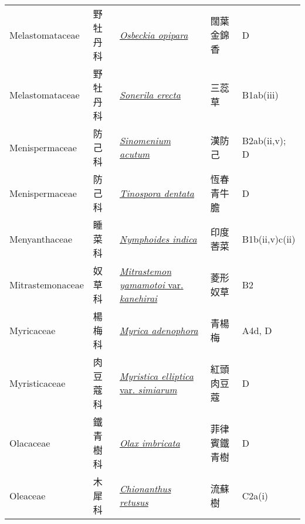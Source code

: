 {\begin{longtable}{p{2.5cm}p{2.5cm}p{4.5cm}p{2.5cm}p{3cm}}
    Melastomataceae & 野牡丹科 & \href{http://www.theplantlist.org/tpl1.1/search?q=Osbeckia+opipara}{\textit{Osbeckia opipara} } & 闊葉金錦香 & D \index{Osbeckia@\textit{Osbeckia}!opipara@\textit{opipara}}  \index{闊葉金錦香} \\
    Melastomataceae & 野牡丹科 & \href{http://www.theplantlist.org/tpl1.1/search?q=Sonerila+erecta}{\textit{Sonerila erecta} } & 三蕊草 & B1ab(iii) \index{Sonerila@\textit{Sonerila}!erecta@\textit{erecta}}  \index{三蕊草} \\
    Menispermaceae & 防己科 & \href{http://www.theplantlist.org/tpl1.1/search?q=Sinomenium+acutum}{\textit{Sinomenium acutum} } & 漢防己 & B2ab(ii,v); D \index{Sinomenium@\textit{Sinomenium}!acutum@\textit{acutum}}  \index{漢防己} \\
    Menispermaceae & 防己科 & \href{http://www.theplantlist.org/tpl1.1/search?q=Tinospora+dentata}{\textit{Tinospora dentata} } & 恆春青牛膽 & D \index{Tinospora@\textit{Tinospora}!dentata@\textit{dentata}}  \index{恆春青牛膽} \\
    Menyanthaceae & 睡菜科 & \href{http://www.theplantlist.org/tpl1.1/search?q=Nymphoides+indica}{\textit{Nymphoides indica} } & 印度莕菜 & B1b(ii,v)c(ii) \index{Nymphoides@\textit{Nymphoides}!indica@\textit{indica}}  \index{印度莕菜} \\
    Mitrastemonaceae & 奴草科 & \href{http://www.theplantlist.org/tpl1.1/search?q=Mitrastemon+yamamotoi+var.+kanehirai}{\textit{Mitrastemon yamamotoi} var. \textit{kanehirai} } & 菱形奴草 & B2 \index{Mitrastemon@\textit{Mitrastemon}!yamamotoi@\textit{yamamotoi}!var. kanehirai@var. \textit{kanehirai}}  \index{菱形奴草} \\
    Myricaceae & 楊梅科 & \href{http://www.theplantlist.org/tpl1.1/search?q=Myrica+adenophora}{\textit{Myrica adenophora} } & 青楊梅 & A4d, D \index{Myrica@\textit{Myrica}!adenophora@\textit{adenophora}}  \index{青楊梅} \\
    Myristicaceae & 肉豆蔻科 & \href{http://www.theplantlist.org/tpl1.1/search?q=Myristica+elliptica+var.+simiarum}{\textit{Myristica elliptica} var. \textit{simiarum} } & 紅頭肉豆蔻 & D \index{Myristica@\textit{Myristica}!elliptica@\textit{elliptica}!var. simiarum@var. \textit{simiarum}}  \index{紅頭肉豆蔻} \\
    Olacaceae & 鐵青樹科 & \href{http://www.theplantlist.org/tpl1.1/search?q=Olax+imbricata}{\textit{Olax imbricata} } & 菲律賓鐵青樹 & D \index{Olax@\textit{Olax}!imbricata@\textit{imbricata}}  \index{菲律賓鐵青樹} \\
    Oleaceae & 木犀科 & \href{http://www.theplantlist.org/tpl1.1/search?q=Chionanthus+retusus}{\textit{Chionanthus retusus} } & 流蘇樹 & C2a(i) \index{Chionanthus@\textit{Chionanthus}!retusus@\textit{retusus}}  \index{流蘇樹} \\

\end{longtable}}
